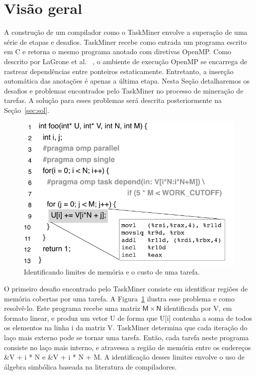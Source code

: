 \documentclass[sigplan,10pt,review]{acmart}
\newcommand\Taskminer{\mbox{\textsf{TaskMiner}}}
\begin{document}
\section{Visão geral}
\label{sec:ovf}

A construção de um compilador como o \Taskminer{} envolve a superação de uma série de etapas e desafios.
\Taskminer{} recebe como entrada um programa escrito em C e retorna o mesmo programa anotado com 
diretivas OpenMP. Como descrito por LaGrone et al. ~\cite{LaGrone11}, 
o ambiente de execução OpenMP se encarrega de 
rastrear dependências entre ponteiros estaticamente. Entretanto, a inserção
automática das anotações é apenas a última etapa. Nesta Seção detalharemos os desafios e problemas
encontrados pelo \Taskminer{} no processo de mineração de tarefas. A solução para esses problemas será descrita 
posteriormente na Seção~\ref{sec:sol}.

\begin{figure}[b!]
\begin{center}
\includegraphics[width=1\columnwidth]{images/ex_Regions}
\caption{Identificando limites de memória e o custo de uma tarefa.}
\label{fig:ex_Regions}
\end{center}
\end{figure}

O primeiro desafio encontrado pelo \Taskminer{} consiste em 
identificar regiões de memória cobertas por uma tarefa.
A Figura~\ref{fig:ex_Regions} ilustra esse problema e como resolvê-lo. Este programa recebe
uma matriz $\mathsf{M}\times\mathsf{N}$ identificada por  \textsf{V}, em formato linear,
e produz um vetor  \textsf{U} de forma que  \textsf{U[i]} contenha a soma de todos
os elementos na linha  \textsf{i} da matriz  \textsf{V}. {\Taskminer} determina que cada
iteração do laço mais externo pode se tornar uma tarefa. Então, cada tarefa neste programa
consiste no laço mais interno, e atravessa a região de memória entre os endereços  \textsf{\&V + i * N} e
 \textsf{\&V + i * N + M}. A identificação desses limites envolve o uso de álgebra simbólica baseada
 na literatura de compiladores.
 
\end{document}
